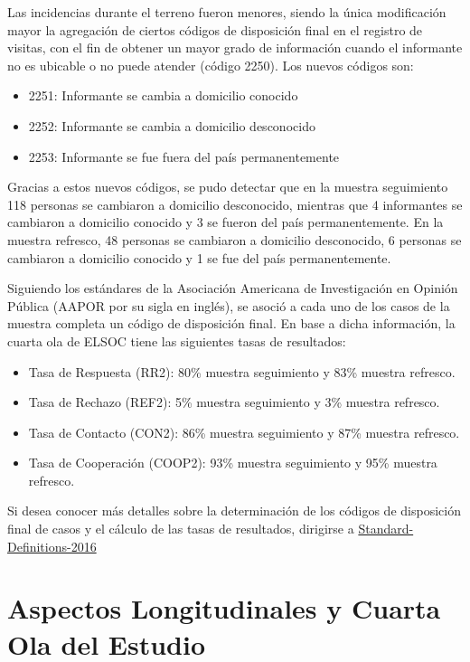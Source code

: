 \documentclass[
]{book}
\begin{document}
Las incidencias durante el terreno fueron menores, siendo la única modificación mayor la agregación de ciertos códigos de disposición final en el registro de visitas, con el fin de obtener un mayor grado de información cuando el informante no es ubicable o no puede atender (código 2250). Los nuevos códigos son:

\begin{itemize}
\item
  2251: Informante se cambia a domicilio conocido
\item
  2252: Informante se cambia a domicilio desconocido
\item
  2253: Informante se fue fuera del país permanentemente
\end{itemize}

Gracias a estos nuevos códigos, se pudo detectar que en la muestra seguimiento 118 personas se cambiaron a domicilio desconocido, mientras que 4 informantes se cambiaron a domicilio conocido y 3 se fueron del país permanentemente. En la muestra refresco, 48 personas se cambiaron a domicilio desconocido, 6 personas se cambiaron a domicilio conocido y 1 se fue del país permanentemente.

Siguiendo los estándares de la Asociación Americana de Investigación en Opinión Pública (AAPOR por su sigla en inglés), se asoció a cada uno de los casos de la muestra completa un código de disposición final. En base a dicha información, la cuarta ola de ELSOC tiene las siguientes tasas de resultados:

\begin{itemize}
\item
  Tasa de Respuesta (RR2): 80\% muestra seguimiento y 83\% muestra refresco.
\item
  Tasa de Rechazo (REF2): 5\% muestra seguimiento y 3\% muestra refresco.
\item
  Tasa de Contacto (CON2): 86\% muestra seguimiento y 87\% muestra refresco.
\item
  Tasa de Cooperación (COOP2): 93\% muestra seguimiento y 95\% muestra refresco.
\end{itemize}

Si desea conocer más detalles sobre la determinación de los códigos de disposición final de casos y el cálculo de las tasas de resultados, dirigirse a \href{http://www.aapor.org/AAPOR_Main/media/publications/Standard-Definitions20169theditionfinal.pdf}{Standard-Definitions-2016}

\hypertarget{aspectos-longitudinales-y-cuarta-ola-del-estudio}{%
\section{Aspectos Longitudinales y Cuarta Ola del Estudio}\label{aspectos-longitudinales-y-cuarta-ola-del-estudio}}
\end{document}
